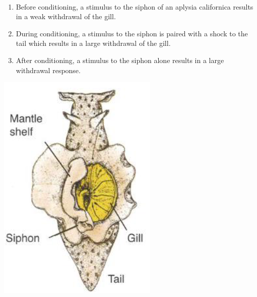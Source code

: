 \begin{casestudy} \phantom{}\\
    \begin{minipage}{0.8\linewidth}
        \begin{enumerate}
            \item Before conditioning, a stimulus to the siphon of an aplysia californica results in a weak withdrawal of the gill.
            \item During conditioning, a stimulus to the siphon is paired with a shock to the tail which results in a large withdrawal of the gill.
            \item After conditioning, a stimulus to the siphon alone results in a large withdrawal response.
        \end{enumerate}
    \end{minipage}
    \begin{minipage}{0.18\linewidth}
        \centering
        \includegraphics[width=\linewidth]{./img/aplysia.png}
    \end{minipage}


\end{casestudy}
